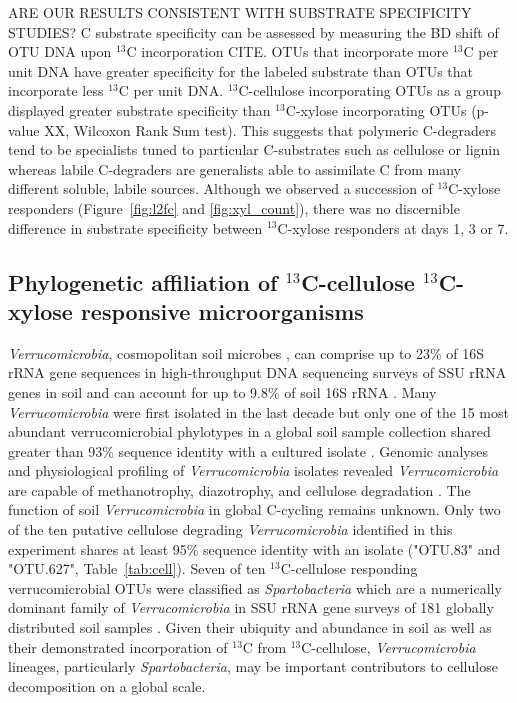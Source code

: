 ARE OUR RESULTS CONSISTENT WITH SUBSTRATE SPECIFICITY STUDIES? C substrate
specificity can be assessed by measuring the BD shift of OTU DNA upon $^{13}$C
incorporation CITE. OTUs that incorporate more $^{13}$C per unit DNA have
greater specificity for the labeled substrate than OTUs that incorporate less
$^{13}$C per unit DNA. $^{13}$C-cellulose incorporating OTUs as a group
displayed greater substrate specificity than $^{13}$C-xylose incorporating OTUs
(p-value XX, Wilcoxon Rank Sum test). This suggests that polymeric C-degraders
tend to be specialists tuned to particular C-substrates such as cellulose or
lignin whereas labile C-degraders are generalists able to assimilate C from
many different soluble, labile sources. Although we observed a succession of
$^{13}$C-xylose responders (Figure~\ref{fig:l2fc} and \ref{fig:xyl_count}),
there was no discernible difference in substrate specificity between
$^{13}$C-xylose responders at days 1, 3 or 7.

\subsection{Phylogenetic affiliation of $^{13}$C-cellulose
    $^{13}$C-xylose responsive microorganisms}
\textit{Verrucomicrobia}, cosmopolitan soil microbes
\citep{Bergmann_2011}, can comprise up to 23\% of 16S rRNA gene sequences in
high-throughput DNA sequencing surveys of SSU rRNA genes in soil
\citep{Bergmann_2011} and can account for up to 9.8\% of
soil 16S rRNA \citep{Buckley_2001}. Many \textit{Verrucomicrobia} were first
isolated in the last decade \cite{Wertz_2011} but only one of the 15 most
abundant verrucomicrobial phylotypes in a global soil sample collection shared
greater than 93\% sequence identity with a cultured isolate
\citep{Bergmann_2011}. Genomic analyses and physiological profiling of
\textit{Verrucomicrobia} isolates revealed \textit{Verrucomicrobia} are capable
of methanotrophy, diazotrophy, and cellulose degradation \citep{Otsuka_2012,
Wertz_2011}. The function of soil \textit{Verrucomicrobia} in global C-cycling
remains unknown. Only two of the ten putative cellulose degrading
\textit{Verrucomicrobia} identified in this experiment shares at least 95\%
sequence identity with an isolate ("OTU.83" and "OTU.627",
Table~\ref{tab:cell}). Seven of ten $^{13}$C-cellulose responding
verrucomicrobial OTUs were classified as \textit{Spartobacteria} which are
a numerically dominant family of \textit{Verrucomicrobia} in SSU rRNA gene
surveys of 181 globally distributed soil samples \citep{Bergmann_2011}. Given
their ubiquity and abundance in soil as well as their demonstrated
incorporation of $^{13}$C from $^{13}$C-cellulose, \textit{Verrucomicrobia}
lineages, particularly \textit{Spartobacteria}, may be important contributors
to cellulose decomposition on a global scale.

